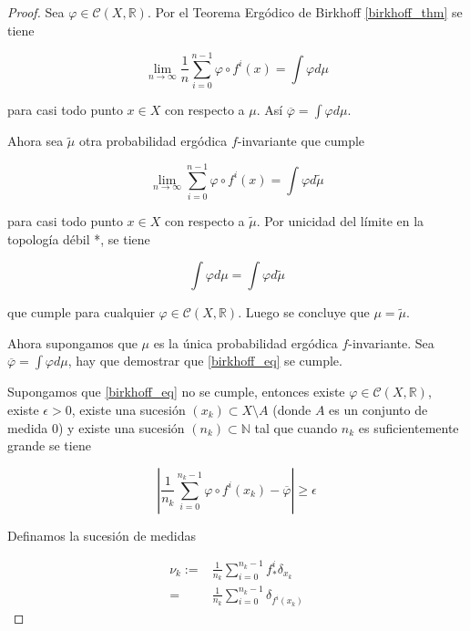 \begin{proof}
	Sea $\varphi \in \mathcal{C}(X, \mathbb{R})$. Por el Teorema Ergódico de Birkhoff \ref{birkhoff_thm} se tiene
	
	\begin{equation}
		\lim_{n \rightarrow \infty} \frac{1}{n} \sum_{i=0}^{n-1} \varphi \circ f^i(x) = \int \varphi d\mu
	\end{equation}
	
	para casi todo punto $x \in X$ con respecto a $\mu$. Así $\overline{\varphi}=\int \varphi d\mu$.
	
	Ahora sea $\tilde{\mu}$ otra probabilidad ergódica $f$-invariante que cumple
	
	\begin{equation}
		\lim_{n \rightarrow \infty} \sum_{i=0}^{n-1} \varphi \circ f^i(x)=\int \varphi d\tilde{\mu}
	\end{equation}
	
	para casi todo punto $x \in X$ con respecto a $\tilde{\mu}$. Por unicidad del límite en la topología débil *, se tiene
	
	\begin{equation}
		\int \varphi d\mu = \int \varphi d\tilde{\mu}
	\end{equation}
	
	que cumple para cualquier $\varphi \in \mathcal{C}(X,\mathbb{R})$. Luego se concluye que $\mu=\tilde{\mu}$.
	
	Ahora supongamos que $\mu$ es la única probabilidad ergódica $f$-invariante. Sea $\overline{\varphi}=\int \varphi d\mu$, hay que demostrar que \eqref{birkhoff_eq} se cumple.
	
	Supongamos que \eqref{birkhoff_eq} no se cumple, entonces existe $\varphi \in \mathcal{C}(X,\mathbb{R})$, existe $\epsilon>0$, existe una sucesión $(x_k) \subset X \setminus A$ (donde $A$ es un conjunto de medida 0) y existe una sucesión $(n_k) \subset \mathbb{N}$ tal que cuando $n_k $ es suficientemente grande se tiene
	
	\begin{equation}
		\left| \frac{1}{n_k} \sum_{i=0}^{n_k-1} \varphi \circ f^i(x_k) - \overline{\varphi} \right| \geq \epsilon \label{negacion_de_eq_birkhoff}
	\end{equation}
	
	Definamos la sucesión de medidas
	
	\begin{align}
		\nu_k := & \frac{1}{n_k} \sum_{i=0}^{n_k-1} f_*^i \delta_{x_k}\\
		=& \frac{1}{n_k} \sum_{i=0}^{n_k-1} \delta_{f^i(x_k)}
	\end{align}
	

\end{proof}

